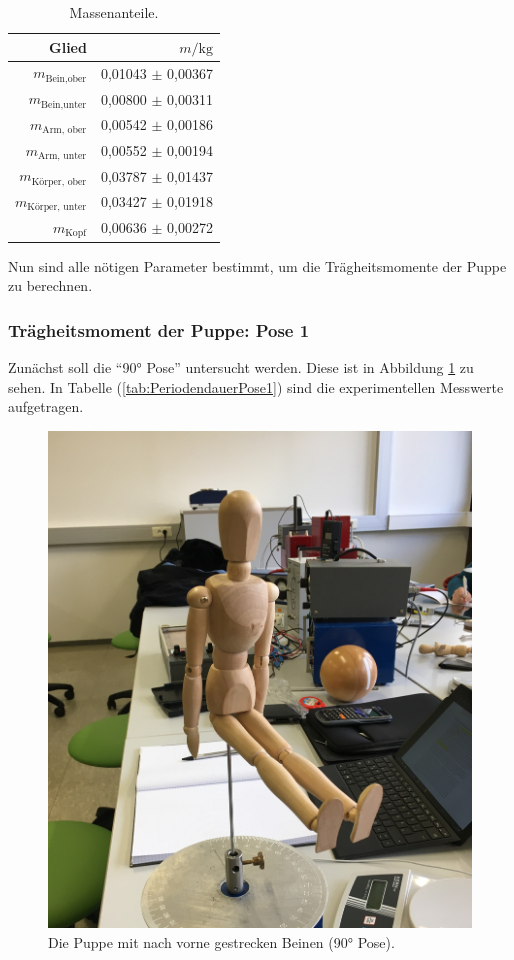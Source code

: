 \begin{table}
  \centering
  \caption{Massenanteile.}
  \label{tab:Massenanteile}
  \begin{tabular}{rr}
  \toprule
  Glied & $m / \unit{\kilo\gram}$ \\
  \midrule
  $m_{\text{Bein,ober}}$      & 0,01043 $\pm$ 0,00367 \\
  $m_{\text{Bein,unter}}$     & 0,00800 $\pm$ 0,00311 \\
  $m_{\text{Arm, ober}}$      & 0,00542 $\pm$ 0,00186 \\
  $m_{\text{Arm, unter}}$     & 0,00552 $\pm$ 0,00194 \\
  $m_{\text{Körper, ober}}$   & 0,03787 $\pm$ 0,01437 \\
  $m_{\text{Körper, unter}}$  & 0,03427 $\pm$ 0,01918 \\
  $m_{\text{Kopf}}$           & 0,00636 $\pm$ 0,00272 \\
  \bottomrule
\end{tabular}
\end{table}


Nun sind alle nötigen Parameter bestimmt, um die Trägheitsmomente der Puppe zu berechnen.

\subsubsection{Trägheitsmoment der Puppe: Pose 1}
Zunächst soll die \enquote{90° Pose} untersucht werden.
Diese ist in Abbildung \ref{fig:pose1} zu sehen.
In Tabelle (\ref{tab:PeriodendauerPose1}) sind die experimentellen Messwerte aufgetragen.


\begin{figure}[H]
  \centering
  \includegraphics[width=0.3\columnwidth]{pictures/puppe_rechter_winkel.jpg}
  \caption{Die Puppe mit nach vorne gestrecken Beinen (90° Pose).}
  \label{fig:pose1}
\end{figure}

